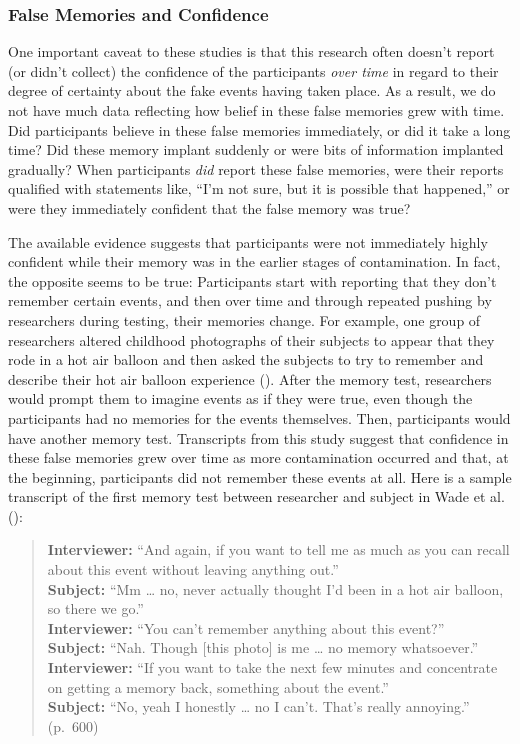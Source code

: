 \documentclass[
]{krantz}
\begin{document}
\subsubsection*{False Memories and Confidence}\label{false-memories-and-confidence}


One important caveat to these studies is that this research often doesn't report (or didn't collect) the confidence of the participants \emph{over time} in regard to their degree of certainty about the fake events having taken place. As a result, we do not have much data reflecting how belief in these false memories grew with time. Did participants believe in these false memories immediately, or did it take a long time? Did these memory implant suddenly or were bits of information implanted gradually? When participants \emph{did} report these false memories, were their reports qualified with statements like, ``I'm not sure, but it is possible that happened,'' or were they immediately confident that the false memory was true?

The available evidence suggests that participants were not immediately highly confident while their memory was in the earlier stages of contamination. In fact, the opposite seems to be true: Participants start with reporting that they don't remember certain events, and then over time and through repeated pushing by researchers during testing, their memories change. For example, one group of researchers altered childhood photographs of their subjects to appear that they rode in a hot air balloon and then asked the subjects to try to remember and describe their hot air balloon experience (). After the memory test, researchers would prompt them to imagine events as if they were true, even though the participants had no memories for the events themselves. Then, participants would have another memory test. Transcripts from this study suggest that confidence in these false memories grew over time as more contamination occurred and that, at the beginning, participants did not remember these events at all. Here is a sample transcript of the first memory test between researcher and subject in Wade et al. ():

\begin{quote}
\textbf{Interviewer:} ``And again, if you want to tell me as much as you can recall about this event without leaving anything out.''\\
\textbf{Subject:} ``Mm \ldots{} no, never actually thought I'd been in a hot air balloon, so there we go.''\\
\textbf{Interviewer:} ``You can't remember anything about this event?''\\
\textbf{Subject:} ``Nah. Though {[}this photo{]} is me \ldots{} no memory whatsoever.''\\
\textbf{Interviewer:} ``If you want to take the next few minutes and concentrate on getting a memory back, something about the event.''\\
\textbf{Subject:} ``No, yeah I honestly \ldots{} no I can't. That's really annoying.'' (p.~600)
\end{quote}
\end{document}

